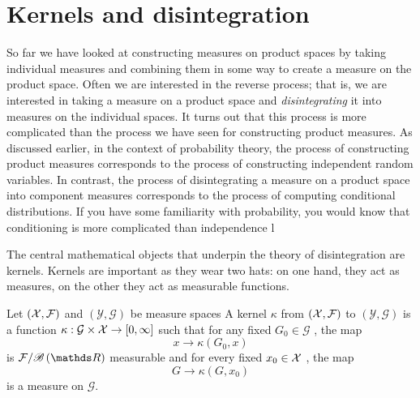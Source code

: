 \section{Kernels and disintegration}

So far we have looked at constructing measures on product spaces by
taking individual measures and combining them in some way to create
a measure on the product space. Often we are interested in the reverse
process; that is, we are interested in taking a measure on a product
space and \emph{disintegrating }it into measures on the individual
spaces. It turns out that this process is more complicated than the
process we have seen for constructing product measures. As discussed
earlier, in the context of probability theory, the process of constructing
product measures corresponds to the process of constructing independent
random variables. In contrast, the process of disintegrating a measure
on a product space into component measures corresponds to the process
of computing conditional distributions. If you have some familiarity
with probability, you would know that conditioning is more complicated
than independence l

The central mathematical objects that underpin the theory of disintegration
are kernels. Kernels are important as they wear two hats: on one hand,
they act as measures, on the other they act as measurable functions.
\begin{defn}
\label{def:kernel}Let $\left(\mathcal{X},\mathcal{F}\right)$ and $\left(\mathcal{Y},\mathcal{G}\right)$
be measure spaces A kernel $\kappa$ from $\left(\mathcal{X},\mathcal{F}\right)$ to
$\left(\mathcal{Y},\mathcal{G}\right)$ is a function $\kappa:\mathcal{G}\times\mathcal{X}\to\left[0,\infty\right]$
such that for any fixed $G_{0}\in\mathcal{G}$ , the map
\[
x\to\kappa\left(G_{0},x\right)
\]
is $\F/\borel\left(\R\right)$ measurable and for every fixed $x_{0}\in\mathcal{X}$
, the map 
\[
G\to\kappa\left(G,x_{0}\right)
\]
is a measure on $\mathcal{G}.$
\end{defn}

